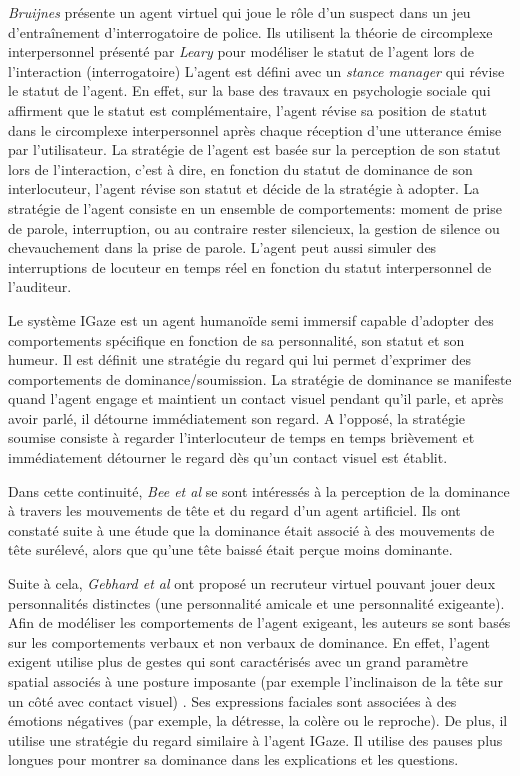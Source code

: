 		\emph{Bruijnes} \cite{bruijnes2013affective} présente un agent virtuel qui joue le rôle d'un suspect dans un jeu d'entraînement 
		d'interrogatoire de police.
		 Ils utilisent la théorie de circomplexe interpersonnel présenté par \emph{Leary} \cite{leary2004interpersonal} pour modéliser le statut de l'agent lors de l'interaction (interrogatoire)
		L'agent est défini avec un \textit{stance manager} qui révise le statut de l'agent. En effet, sur la base des travaux en psychologie sociale qui affirment que le statut est complémentaire, l'agent révise sa position de statut dans le circomplexe interpersonnel après chaque réception d'une utterance émise par l'utilisateur. La stratégie de l'agent est basée sur la perception de son statut lors de l'interaction, c'est à dire, en fonction du statut de dominance de son interlocuteur, l'agent révise son statut et décide de la stratégie à adopter. La stratégie de l'agent consiste en un ensemble de comportements: moment de prise de parole, interruption, ou au contraire rester silencieux, la gestion de silence ou chevauchement dans la prise de parole. L'agent peut aussi simuler des interruptions de locuteur en temps réel en fonction du statut interpersonnel de l'auditeur.
		
		Le système	IGaze  \cite{kipp2008igaze} est un agent humanoïde semi immersif capable d'adopter des comportements spécifique en fonction de sa personnalité, son statut et son humeur. Il est définit une stratégie du regard qui lui permet d'exprimer des comportements de dominance/soumission. La stratégie de dominance se manifeste quand l'agent engage et maintient un contact visuel pendant qu'il parle, et après avoir parlé, il détourne immédiatement son regard. A l'opposé, la stratégie soumise consiste à regarder l'interlocuteur de temps en temps brièvement et immédiatement détourner le regard dès qu'un contact visuel est établit. 
		
		Dans cette continuité, \emph{Bee et al} \cite{bee2009relations} se sont intéressés à la perception de la dominance à travers les mouvements de tête et du regard d'un agent artificiel. Ils ont constaté suite à une étude que la dominance était associé à des mouvements de tête surélevé, alors que qu'une tête baissé était perçue moins dominante.
		
		Suite à cela, \emph{Gebhard et al} \cite{gebhard2014exploring} ont proposé un recruteur virtuel pouvant jouer deux personnalités distinctes (une personnalité amicale et une personnalité exigeante). Afin de modéliser les comportements de l'agent exigeant, les auteurs se sont basés sur les comportements verbaux et non verbaux de dominance. En effet, l'agent exigent utilise plus de gestes qui sont caractérisés avec un grand paramètre spatial associés à une posture imposante (par exemple l'inclinaison de la tête sur un côté avec  contact visuel) \cite{gebhard2014exploring}. Ses expressions faciales sont associées à des émotions négatives (par exemple, la détresse, la colère ou le reproche). De plus, il utilise une stratégie du regard similaire à l'agent IGaze.
		Il utilise des pauses plus longues pour montrer sa dominance dans les explications et les questions. 
		
